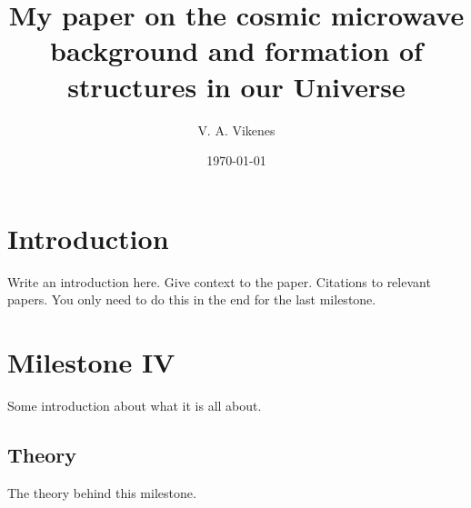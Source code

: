 \documentclass{aa}
\begin{document}
 

   \title{My paper on the cosmic microwave background and formation of structures in our Universe}

   \author{V. A. Vikenes}
 

   \date{\today}



   \maketitle

\section{Introduction}
Write an introduction here. Give context to the paper. Citations to relevant papers. You only need to do this in the end for the last milestone. %












\section{Milestone IV}
Some introduction about what it is all about.

\subsection{Theory}
The theory behind this milestone.
\end{document}
